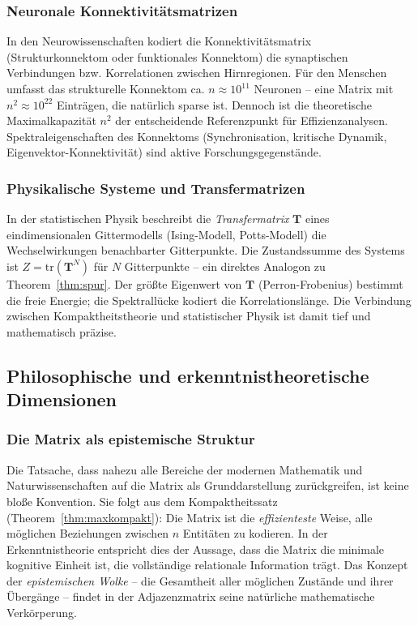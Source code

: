 ﻿\documentclass[12pt, a4paper]{article}
\theoremstyle{definition}
\theoremstyle{remark}
\newcommand{\vT}{\bm{T}}
\newcommand{\tr}{\mathrm{tr}}
\begin{document}
\subsubsection*{Neuronale Konnektivitätsmatrizen}

In den Neurowissenschaften kodiert die Konnektivitätsmatrix (Strukturkonnektom
oder funktionales Konnektom) die synaptischen Verbindungen bzw.
Korrelationen zwischen Hirnregionen. Für den Menschen umfasst das
strukturelle Konnektom ca. $n \approx 10^{11}$ Neuronen -- eine Matrix
mit $n^2 \approx 10^{22}$ Einträgen, die natürlich sparse ist.
Dennoch ist die theoretische Maximalkapazität $n^2$ der entscheidende
Referenzpunkt für Effizienzanalysen. Spektraleigenschaften des
Konnektoms (Synchronisation, kritische Dynamik, Eigenvektor-Konnektivität)
sind aktive Forschungsgegenstände.

\subsubsection*{Physikalische Systeme und Transfermatrizen}

In der statistischen Physik beschreibt die \emph{Transfermatrix}
$\vT$ eines eindimensionalen Gittermodells (Ising-Modell, Potts-Modell)
die Wechselwirkungen benachbarter Gitterpunkte. Die Zustandssumme des
Systems ist $Z = \tr(\vT^N)$ für $N$ Gitterpunkte -- ein direktes
Analogon zu Theorem~\ref{thm:spur}. Der größte Eigenwert von $\vT$
(Perron-Frobenius) bestimmt die freie Energie; die Spektrallücke
kodiert die Korrelationslänge. Die Verbindung zwischen
Kompaktheitstheorie und statistischer Physik ist damit tief und
mathematisch präzise.

\subsection{Philosophische und erkenntnistheoretische Dimensionen}
\label{subsec:philosophie}

\subsubsection*{Die Matrix als epistemische Struktur}

Die Tatsache, dass nahezu alle Bereiche der modernen Mathematik und
Naturwissenschaften auf die Matrix als Grunddarstellung zurückgreifen,
ist keine bloße Konvention. Sie folgt aus dem Kompaktheitssatz
(Theorem~\ref{thm:maxkompakt}): Die Matrix ist die \emph{effizienteste}
Weise, alle möglichen Beziehungen zwischen $n$ Entitäten zu kodieren.
In der Erkenntnistheorie entspricht dies der Aussage, dass die Matrix
die minimale kognitive Einheit ist, die vollständige relationale
Information trägt. Das Konzept der \emph{epistemischen Wolke}
\citep{epp2026sysstate} -- die Gesamtheit aller möglichen Zustände
und ihrer Übergänge -- findet in der Adjazenzmatrix seine natürliche
mathematische Verkörperung.
\end{document}
